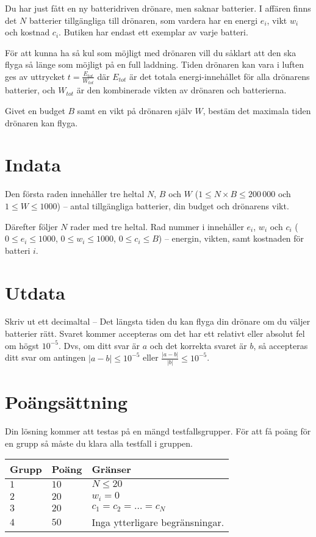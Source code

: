 
Du har just fått en ny batteridriven drönare, men saknar batterier.
I affären finns det $N$ batterier tillgängliga till drönaren,
som vardera har en energi $e_i$, vikt $w_i$ och kostnad $c_i$.
Butiken har endast ett exemplar av varje batteri.

För att kunna ha så kul som möjligt med drönaren vill du såklart att den ska
flyga så länge som möjligt på en full laddning.
Tiden drönaren kan vara i luften ges av uttrycket $t = \frac{E_{tot}}{W_{tot}}$ där $E_{tot}$
är det totala energi-innehållet för alla drönarens batterier, och $W_{tot}$ är den kombinerade vikten av drönaren och batterierna. 

Givet en budget $B$ samt en vikt på drönaren själv $W$, bestäm
det maximala tiden drönaren kan flyga.


\section*{Indata}
Den första raden innehåller tre heltal $N$, $B$ och $W$
($1 \le N\times B \le 200\,000$ och $1\le W \le 1000$) -- antal tillgängliga batterier, din budget och drönarens vikt.

Därefter följer $N$ rader med tre heltal. Rad nummer i innehåller $e_i$,
$w_i$ och $c_i$ ($0 \le e_i \le 1000$, $0 \le w_i \le 1000$, $0 \le c_i \le B$) 
-- energin, vikten, samt kostnaden för batteri $i$.

\section*{Utdata}
Skriv ut ett decimaltal -- Det längsta tiden du kan flyga din drönare om du väljer batterier rätt. 
Svaret kommer accepteras om det har ett relativt eller absolut fel om högst $10^{-5}$.
Dvs, om ditt svar är $a$ och det korrekta svaret är $b$, så accepteras ditt svar om
antingen $|a-b| \le 10^{-5}$ eller $\frac{|a-b|}{|b|} \le 10^{-5}$.

\section*{Poängsättning}
Din lösning kommer att testas på en mängd testfallsgrupper.
För att få poäng för en grupp så måste du klara alla testfall i gruppen.

\noindent
\begin{tabular}{| l | l | l |}
  \hline
  \textbf{Grupp} & \textbf{Poäng} & \textbf{Gränser} \\ \hline
  $1$   & $10$       & $N \leq 20$ \\ \hline
  $2$   & $20$       & $w_i = 0$ \\ \hline
  $3$   & $20$       & $c_1 = c_2 = \dots = c_N$ \\ \hline
  $4$   & $50$       & Inga ytterligare begränsningar. \\ \hline
\end{tabular}
